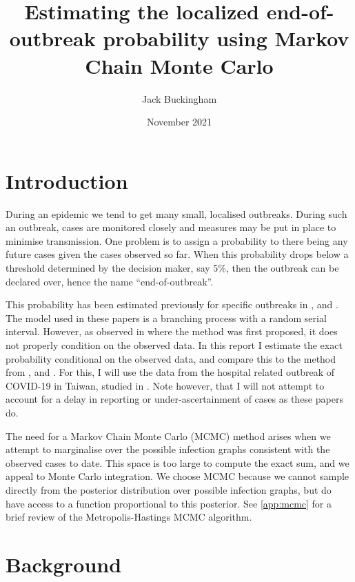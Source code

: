\documentclass{article}
\title{Estimating the localized end-of-outbreak probability using Markov Chain Monte Carlo}
\author{Jack Buckingham}
\date{November 2021}
\begin{document}
\maketitle


\section{Introduction}
During an epidemic we tend to get many small, localised outbreaks. During such an outbreak, cases are monitored closely and measures may be put in place to minimise transmission. One problem is to assign a probability to there being any future cases given the cases observed so far. When this probability drops below a threshold determined by the decision maker, say 5\%, then the outbreak can be declared over, hence the name ``end-of-outbreak''.

This probability has been estimated previously for specific outbreaks in \cite{Linton2021}, \cite{Akhmetzhanov2021} and \cite{Nishiura2016}. The model used in these papers is a branching process with a random serial interval. However, as observed in \cite{Nishiura2016} where the method was first proposed, it does not properly condition on the observed data. In this report I estimate the exact probability conditional on the observed data, and compare this to the method from \cite{Linton2021}, \cite{Akhmetzhanov2021} and \cite{Nishiura2016}. For this, I will use the data from the hospital related outbreak of COVID-19 in Taiwan, studied in \cite{Akhmetzhanov2021}. Note however, that I will not attempt to account for a delay in reporting or under-ascertainment of cases as these papers do.

The need for a Markov Chain Monte Carlo (MCMC) method arises when we attempt to marginalise over the possible infection graphs consistent with the observed cases to date. This space is too large to compute the exact sum, and we appeal to Monte Carlo integration. We choose MCMC because we cannot sample directly from the posterior distribution over possible infection graphs, but do have access to a function proportional to this posterior. See \autoref{app:mcmc} for a brief review of the Metropolis-Hastings MCMC algorithm.

\section{Background}\label{sec:background}
\end{document}
